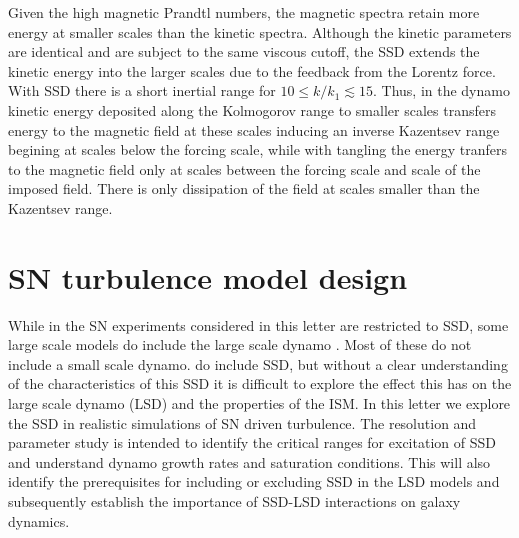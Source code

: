\documentclass[preprint2]{aastex63}
\begin{document}
Given the high magnetic Prandtl numbers, the magnetic spectra retain more energy
at smaller scales than the kinetic spectra.
Although the kinetic parameters are identical and are subject to the same 
viscous cutoff, the SSD extends the kinetic energy into the larger scales
due to the feedback from the Lorentz force.
With SSD there is a short inertial range for $10\leq k/k_1\lesssim 15$.
Thus, in the dynamo kinetic energy deposited along the Kolmogorov range to
smaller scales transfers energy to the magnetic field at these scales
inducing an inverse Kazentsev range begining at scales below the forcing
scale, while with tangling the energy tranfers to the magnetic field
only at scales between the forcing scale and scale of the imposed field.
There is only dissipation of the field at scales smaller than the Kazentsev 
range.


\section{SN turbulence model design} \label{sec:model}

While in the SN experiments considered in this letter are restricted to
SSD, some large scale models do include the large scale dynamo
\citep[e.g.,][]{Gressel:2008,HWK09,WA09,Gent:2013b,EGSFB16,Pakmor17,SBADMN19,SDLMBP20,GE20}.
Most of these do not include a small scale dynamo.
\citet{Gent:2013b,EGSFB16} do include SSD, but without a clear understanding of
the characteristics of this SSD it is difficult to explore the effect this has
on the large scale dynamo (LSD) and the properties of the ISM.
In this letter we explore the SSD in realistic simulations of SN driven 
turbulence.
The resolution and parameter study is intended to identify the critical ranges
for excitation of SSD and understand dynamo growth rates and saturation 
conditions.
This will also identify the prerequisites for including or excluding SSD in the
LSD models and subsequently establish the importance of SSD-LSD interactions 
on galaxy dynamics. 
\end{document}
